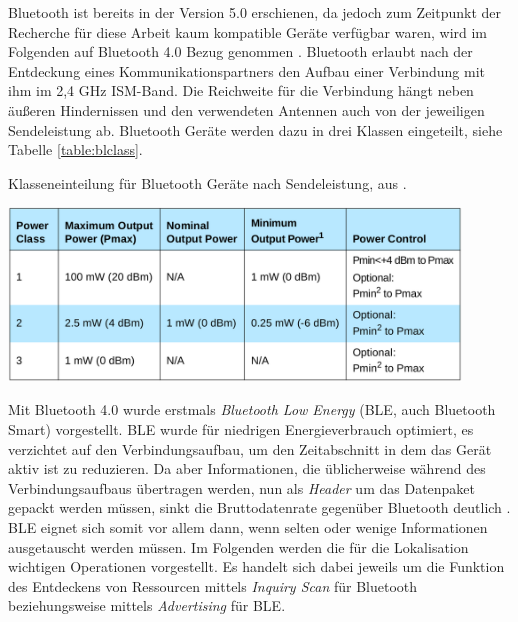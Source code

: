 Bluetooth ist bereits in der Version 5.0 erschienen, da jedoch zum Zeitpunkt der Recherche für diese Arbeit kaum kompatible Geräte verfügbar waren, wird im Folgenden auf Bluetooth 4.0 Bezug genommen \cite{blue2010spec}.
Bluetooth erlaubt nach der Entdeckung eines Kommunikationspartners den Aufbau einer Verbindung mit ihm im 2,4 GHz ISM-Band.
Die Reichweite für die Verbindung hängt neben äußeren Hindernissen und den verwendeten Antennen auch von der jeweiligen Sendeleistung ab.
Bluetooth Geräte werden dazu in drei Klassen eingeteilt, siehe Tabelle \ref{table:blclass}.

\begin{table}[h]
  \centering
	\caption{Klasseneinteilung für Bluetooth Geräte nach Sendeleistung, aus \cite{blue2010classes}.}
	\includegraphics[width=0.9\textwidth]{images/blueclasses.png}
  \label{table:blclass}
\end{table}

Mit Bluetooth 4.0 wurde erstmals \emph{Bluetooth Low Energy} (BLE, auch Bluetooth Smart) vorgestellt.
BLE wurde für niedrigen Energieverbrauch optimiert, es verzichtet auf den Verbindungsaufbau, um den Zeitabschnitt in dem das Gerät aktiv ist zu reduzieren.
Da aber Informationen, die üblicherweise während des Verbindungsaufbaus übertragen werden, nun als \emph{Header} um das Datenpaket gepackt werden müssen, sinkt die Bruttodatenrate gegenüber Bluetooth deutlich \cite{rigado2016practical}. 
BLE eignet sich somit vor allem dann, wenn selten oder wenige Informationen ausgetauscht werden müssen.
Im Folgenden werden die für die Lokalisation wichtigen Operationen vorgestellt.
Es handelt sich dabei jeweils um die Funktion des Entdeckens von Ressourcen mittels \emph{Inquiry Scan} für Bluetooth beziehungsweise mittels \emph{Advertising} für BLE.

